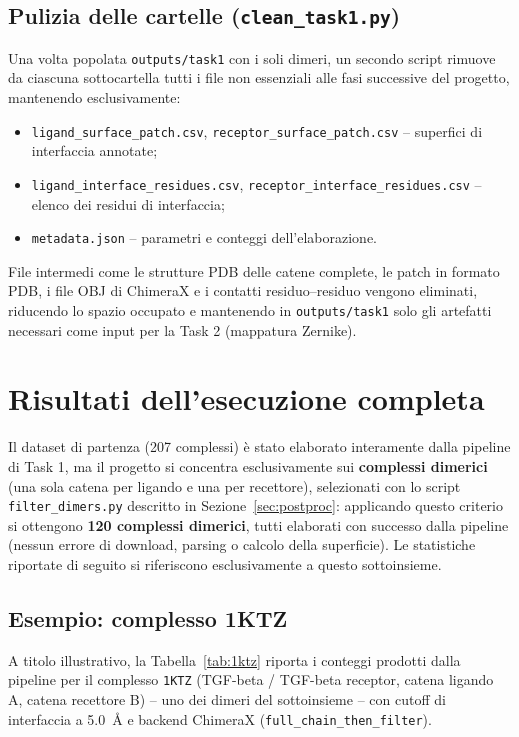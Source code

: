 \documentclass[11pt,a4paper]{article}
\begin{document}
\subsection{Pulizia delle cartelle (\texttt{clean\_task1.py})}
Una volta popolata \texttt{outputs/task1} con i soli dimeri, un secondo script rimuove da ciascuna sottocartella tutti i file non essenziali alle fasi successive del progetto, mantenendo esclusivamente:
\begin{itemize}
    \item \texttt{ligand\_surface\_patch.csv}, \texttt{receptor\_surface\_patch.csv} -- superfici di interfaccia annotate;
    \item \texttt{ligand\_interface\_residues.csv}, \texttt{receptor\_interface\_residues.csv} -- elenco dei residui di interfaccia;
    \item \texttt{metadata.json} -- parametri e conteggi dell'elaborazione.
\end{itemize}
File intermedi come le strutture PDB delle catene complete, le patch in formato PDB, i file OBJ di ChimeraX e i contatti residuo--residuo vengono eliminati, riducendo lo spazio occupato e mantenendo in \texttt{outputs/task1} solo gli artefatti necessari come input per la Task 2 (mappatura Zernike).

\section{Risultati dell'esecuzione completa}
\label{sec:results}

Il dataset di partenza (207 complessi) è stato elaborato interamente dalla pipeline di Task 1, ma il progetto si concentra esclusivamente sui \textbf{complessi dimerici} (una sola catena per ligando e una per recettore), selezionati con lo script \texttt{filter\_dimers.py} descritto in Sezione~\ref{sec:postproc}: applicando questo criterio si ottengono \textbf{120 complessi dimerici}, tutti elaborati con successo dalla pipeline (nessun errore di download, parsing o calcolo della superficie). Le statistiche riportate di seguito si riferiscono esclusivamente a questo sottoinsieme.

\subsection{Esempio: complesso 1KTZ}
A titolo illustrativo, la Tabella~\ref{tab:1ktz} riporta i conteggi prodotti dalla pipeline per il complesso \texttt{1KTZ} (TGF-beta / TGF-beta receptor, catena ligando A, catena recettore B) -- uno dei dimeri del sottoinsieme -- con cutoff di interfaccia a 5.0~\r{A} e backend ChimeraX (\texttt{full\_chain\_then\_filter}).
\end{document}
